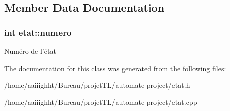 \subsection{Member Data Documentation}
\hypertarget{classetat_a155cdfece54b9e8f4a633249ee037595}{
\subsubsection[{numero}]{\setlength{\rightskip}{0pt plus 5cm}int etat\-::numero}}\label{classetat_a155cdfece54b9e8f4a633249ee037595}
Numéro de l'état 

The documentation for this class was generated from the following files\-:\begin{DoxyCompactItemize}
\item 
/home/aaiiighht/\-Bureau/projet\-T\-L/automate-\/project/etat.\-h\item 
/home/aaiiighht/\-Bureau/projet\-T\-L/automate-\/project/etat.\-cpp\end{DoxyCompactItemize}
